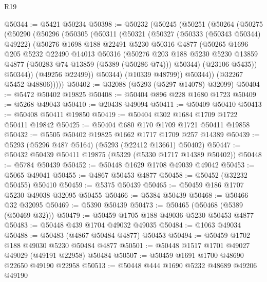 \begin{lexlean}{R19}
\begin{coremodule}
@50344 := @5421 @50234
@50398 := @50232
    (@50245
      (@50251
        (@50264
          (@50275
            (@50290
              (@50296
                (@50305
                  (@50311
                    (@50321
                      (@50327
                        (@50333 (@50343 @50344) @49222)
                        (@50276
                          @1698
                          @188
                          @22491
                          @5230
                          @50316
                          @4877
                          (@50265
                            @1696
                            @205
                            @5232
                            @22490
                            @14013
                            @50316
                            (@50276
                              @203
                              @188
                              @5230
                              @5230
                              @13859
                              @4877
                              (@50283 @74 @13859 (@5389 (@50286 @74)))
                              @50344)
                            (@23106 @5435))
                          @50344))
                      (@49256 @22499))
                    @50344)
                  (@10339 @48799))
                @50344))
            (@32267 @5452 @48806)))))
@50402 := @32088 (@5293 (@5297 @14078) @32099)
@50404 := @5472 @50402 @19825
@50408 := @50404 @896 @228 @1680 @1723
@50409 := @5268 @49043
@50410 := @20438 @49094
@50411 := @50409 @50410
@50413 := @50408 @50411 @19850
@50419 := @50404 @302 @1684 @1709 @1722 @50411 @19842
@50425 := @50404 @680 @170 @1709 @1721 @50411 @19858
@50432 := @5505 @50402 @19825 @1662 @1717 @1709 @257 @14389
@50439 := @5293 (@5296 @487 @5164) (@5293 (@22412 @13661) @50402)
@50447 := @50432 @50439 @50411 @19875 (@5329 (@5330 @1717 @14389 @50402))
@50448 := @5784 @50439
@50452 := @50448 @1629 @1708 @49039 @49042
@50453 := @5065 @49041
@50455 := @4867 @50453 @4877
@50458 := @50452 (@32232 @50455) @50410
@50459 := @5375 @50439
@50465 := @50459 @186 @1707 @5230 @49038 @32095 @50455
@50466 := @5384 @50439
@50468 := @50466 @32 @32095
@50469 := @5390 @50439
@50473 := @50465 (@50468 (@5389 (@50469 @32)))
@50479 := @50459 @1705 @188 @49036 @5230 @50453 @4877
@50483 := @50448 @439 @1704 @49032 @49035
@50484 := @1063 @49034
@50488 := @50483 (@4867 @50484 @4877) @50453
@50494 := @50459 @1702 @188 @49030 @5230 @50484 @4877
@50501 := @50448 @1517 @1701 @49027 @49029 (@49191 @22958) @50484
@50507 := @50459 @1691 @1700 @48690 @22650 @49190 @22958
@50513 := @50448 @444 @1690 @5232 @48689 @49206 @49190

\end{coremodule}
\end{lexlean}
